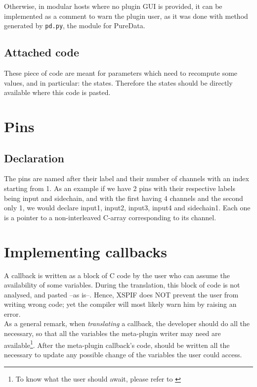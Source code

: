 \noindent Otherwise, in modular hosts where no plugin GUI is provided, it can be implemented as a comment to warn the plugin user, as it was done with method  generated by \verb|pd.py|, the module for PureData.

\subsection{Attached code}
\noindent These piece of code are meant for parameters which need to
recompute some values, and in particular: the states. Therefore the states
should be directly available where this code is pasted.

\section{Pins}
\subsection{Declaration}
\noindent The pins are named after their label and their number of
channels with an index starting from 1. As an example if we have 2
pins with their respective labels being input and sidechain, and with
the first having 4 channels and the second only 1, we would declare
input1, input2, input3, input4 and sidechain1. Each one is a
pointer to a non-interleaved C-array corresponding to its channel.


\section{Implementing callbacks}
\noindent A callback is written as a block of C code by the user who can assume the availability of some variables. During the translation, this block of code is not analysed, and pasted --as is--. Hence, XSPIF does NOT prevent the user from writing wrong code; yet the compiler will most likely warn him by raising an error.\\
\noindent As a general remark, when \emph{translating} a callback, the
developer should do all the necessary, so that all the variables the
meta-plugin writer may need are available\footnote{To know what the
  user should await, please refer to
  \cite{xspif:userguide}}\label{footnote}.  After the meta-plugin
callback's code, should be written all the necessary to update any
possible change of the variables the user could access.\\ 

